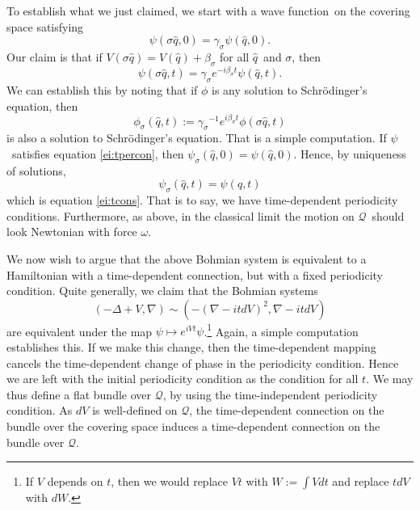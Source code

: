 \documentclass[11pt]{article}
\theoremstyle{remark}
\begin{document}
To establish what we just claimed, we start with a wave function\ on the
covering space satisfying 
\begin{equation} \label{ei:tpercon}
\ensuremath{\psi} (\ensuremath{\sigma} \ensuremath{\hat{q}}, 0) = \ensuremath{\gamma_{\ensuremath{\sigma}}} \ensuremath{\psi}(\ensuremath{\hat{q}},0).
\end{equation}
 Our claim is that if $V(\ensuremath{\sigma} \ensuremath{\hat{q}}) = V(\ensuremath{\hat{q}}) +
\beta_{\ensuremath{\sigma}}$ for all \ensuremath{\hat{q}}\ and \ensuremath{\sigma}, then 
\begin{equation} \label{ei:tcons}
\ensuremath{\psi} (\ensuremath{\sigma} \ensuremath{\hat{q}} , t) 
= \ensuremath{\gamma_{\ensuremath{\sigma}}} e^{-i \beta_{\ensuremath{\sigma}}t} \ensuremath{\psi} (\ensuremath{\hat{q}}, t).    
\end{equation}
We can establish this by noting that if $\phi$ is any solution to 
Schr\"odinger's equation, then  
\[\phi_{\ensuremath{\sigma}} (\ensuremath{\hat{q}},t)
\ensuremath{:=} 
\ensuremath{\gamma_{\ensuremath{\sigma}}}^{-1}  e^{i \beta_{\ensuremath{\sigma}}t} \phi (\ensuremath{\sigma}
\ensuremath{\hat{q}}, t)
\] is also a solution to Schr\"odinger's equation. That is a simple computation. If \ensuremath{\psi}\
satisfies equation \eqref{ei:tpercon}, then $\ensuremath{\psi}_{\ensuremath{\sigma}}(\ensuremath{\hat{q}}, 0) =
 \ensuremath{\psi}(\ensuremath{\hat{q}}, 0)$. Hence, by uniqueness of solutions, 
\[\ensuremath{\psi}_{\sigma}(\ensuremath{\hat{q}}, t) = \ensuremath{\psi}(\ensuremath{\hat{q}}, t)\] which is equation
 \eqref{ei:tcons}.
That is to say,  we have time-dependent periodicity
conditions. Furthermore, as above, in the classical
limit the motion on \ensuremath{\mathcal{Q}}\ should look Newtonian with force $\omega$.

We now wish to argue that the above Bohmian system
 is equivalent to a Hamiltonian with a
time-dependent connection, but with a fixed periodicity
condition. Quite generally, we claim that the 
Bohmian
systems 
\begin{equation} \label{e:2thry}
(-\ensuremath{\Delta} + V, \nabla) \ensuremath{\sim} (-(\nabla -i
tdV )^2, \nabla -i
tdV )
\end{equation}
are equivalent
under the map $\ensuremath{\psi} \mapsto e^{ i V t} \ensuremath{\psi}$.\footnote{If $V$ depends on
$t$, then we would replace $Vt$ with $W \ensuremath{:=} \int V dt$ and replace
$tdV $ with $dW$. 
}
 Again, a simple computation
establishes this. If we make this change, then the time-dependent
mapping cancels the time-dependent change of phase in the periodicity
condition. Hence we are  left with the initial periodicity condition as
the condition for all $t$. We may 
thus
define a flat bundle over \ensuremath{\mathcal{Q}}, by using the time-independent periodicity
condition. As $dV$ is well-defined on \ensuremath{\mathcal{Q}},  
the time-dependent connection on the bundle over the covering
space induces a time-dependent connection on the bundle over
\ensuremath{\mathcal{Q}}. 
\end{document}
